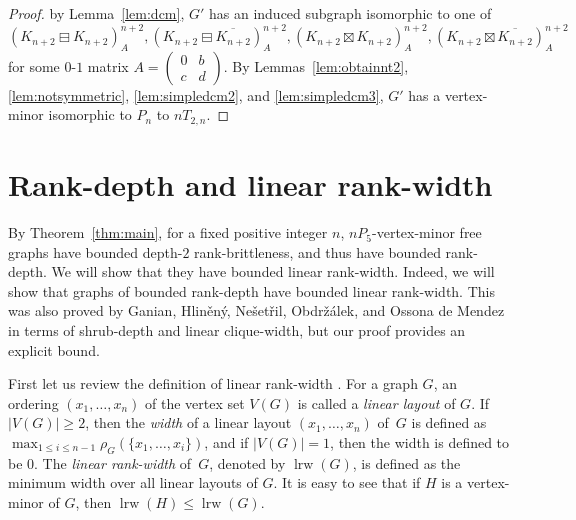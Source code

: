 \documentclass[11pt]{article}
\newcommand\abs[1]{\lvert #1\rvert}
\newcommand\mat{\boxminus}
\newcommand\antimat{\boxtimes}
\def\S_#1{\overline{K_{#1}}}
\newcommand\cutrk{\rho}
\newcommand\lrw{\operatorname{lrw}}
\begin{document}
\begin{proof}
                by Lemma~\ref{lem:dcm},
                $G'$ has an induced subgraph isomorphic to
                one of 
                \[(K_{n+2}\mat K_{n+2})^{n+2}_A,
                  (K_{n+2}\mat \S_{n+2})^{n+2}_A,
                  (K_{n+2}\antimat K_{n+2})^{n+2}_A, 
                  (K_{n+2}\antimat \S_{n+2})^{n+2}_A\]
                for some $0$-$1$ matrix $A=
                (\begin{smallmatrix}
                  0&b \\c&d 
                \end{smallmatrix})$.
                By Lemmas~\ref{lem:obtainnt2}, \ref{lem:notsymmetric}, \ref{lem:simpledcm2}, and \ref{lem:simpledcm3},
                $G'$ has a vertex-minor isomorphic to $P_n$ to $nT_{2,n}$.
      \end{proof}
	
		\section{Rank-depth and linear rank-width}\label{sec:application}
	
	By Theorem~\ref{thm:main}, 
for a fixed positive integer $n$, 
$nP_5$-vertex-minor free graphs have bounded 
depth-$2$ rank-brittleness, and thus have bounded rank-depth.
We will show that
they have bounded linear rank-width. 
Indeed, we will show that graphs of bounded rank-depth
have bounded linear rank-width.
This was also proved by 
Ganian, Hlin\v{e}n\'{y}, Ne{\v{s}}et{\v{r}}il, Obdr\v{z}\'{a}lek, 
and Ossona de Mendez~\cite[Proposition 3.4]{GHNOO2017} in terms of shrub-depth and linear clique-width, but our proof provides an explicit bound.

	First let us review the definition of linear rank-width \cite{Ganian2011,JKO2014,Oum2016}.
For a graph $G$, an ordering $(x_1, \ldots, x_n)$ of the vertex set $V(G)$ is called a \emph{linear layout} of $G$.  
	If $\abs{V(G)}\ge 2$, then the \emph{width} of a linear layout $(x_1,\ldots, x_n)$ of~$G$ is defined
as
$\displaystyle\max_{1\le i\le n-1}\cutrk_G(\{x_1,\ldots,x_i\})$,
and if $\abs{V(G)}=1$, then the width is defined to be $0$.
	The \emph{linear rank-width} of~$G$, denoted by $\lrw(G)$, is defined as the minimum width over all linear layouts of $G$. 
	It is easy to see that if $H$ is a vertex-minor of $G$, then $\lrw(H)\le \lrw(G)$.
	
%
%
\end{document}
